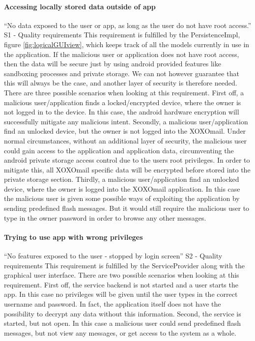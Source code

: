 \paragraph{Accessing locally stored data outside of app}\hfill
\newline
“No data exposed to the user or app, as long as the user do not have root access.” S1 - Quality requirements
\newline
\newline
This requirement is fulfilled by the PersistenceImpl, figure \ref{fig:logicalGUIview}, which keeps track of all the models currently in use in the application. If the malicious user or application does not have root access, then the data will be secure just by using android provided features like sandboxing processes and private storage. We can not however guarantee that this will always be the case, and another layer of security is therefore needed. 
\newline
\newline
There are three possible scenarios when looking at this requirement. First off, a malicious user/application finds a locked/encrypted device, where the owner is not logged in to the device. In this case, the android hardware encryption will successfully mitigate any malicious intent.
Secondly, a malicious user/application find an unlocked device, but the owner is not logged into the XOXOmail. Under normal circumstances, without an additional layer of security, the malicious user could gain access to the application and application data, circumventing the android private storage access control due to the users root privileges. In order to mitigate this, all XOXOmail specific data will be encrypted before stored into the private storage section. 
Thirdly, a malicious user/application find an unlocked device, where the owner is logged into the XOXOmail application. In this case the malicious user is given some possible ways of exploiting the application by sending predefined flash messages. But it would still require the malicious user to type in the owner password in order to browse any other messages. 

\paragraph{Trying to use app with wrong privileges} \hfill
\newline
“No features exposed to the user - stopped by login screen” S2 - Quality requirements
\newline
\newline
This requirement is fulfilled by the ServiceProvider along with the graphical user interface. There are two possible scenarios when looking at this requirement. First off, the service backend is not started and a user starts the app. In this case no privileges will be given until the user types in the correct username and password. In fact, the application itself does not have the possibility to decrypt any data without this information.
Second, the service is started, but not open. In this case a malicious user could send predefined flash messages, but not view any messages, or get access to the system as a whole. 

